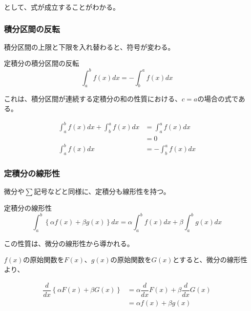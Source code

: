 \documentclass[../../imaging-math]{subfiles}
\begin{document}
として、式が成立することがわかる。

\subsubsection{積分区間の反転}

積分区間の上限と下限を入れ替わると、符号が変わる。

\begin{theorem}{定積分の積分区間の反転}
  \LARGE
  \begin{equation}
    \int_{a}^{b} f(x) dx = -\int_{b}^{a} f(x) dx
  \end{equation}
\end{theorem}

これは、積分区間が連続する定積分の和の性質における、$c=a$の場合の式である。

\begin{align}
  \int_{a}^{b} f(x) dx + \int_{b}^{a} f(x) dx & = \int_{a}^{a} f(x) dx  \\
                                              & = 0                     \\
  \int_{a}^{b} f(x) dx                        & = -\int_{b}^{a} f(x) dx
\end{align}

\subsubsection{定積分の線形性}

微分や$\sum$記号などと同様に、定積分も線形性を持つ。

\begin{theorem}{定積分の線形性}
  \Large
  \begin{equation}
    \int_{a}^{b} \left\{ \alpha f(x) + \beta g(x) \right\} dx = \alpha \int_{a}^{b} f(x) dx + \beta \int_{a}^{b} g(x) dx
  \end{equation}
\end{theorem}

この性質は、微分の線形性から導かれる。

$f(x)$の原始関数を$F(x)$、$g(x)$の原始関数を$G(x)$とすると、微分の線形性より、

\begin{align}
  \dfrac{d}{dx} \left\{ \alpha F(x) + \beta G(x) \right\} & = \alpha \dfrac{d}{dx} F(x) + \beta \dfrac{d}{dx} G(x) \\
                                                          & = \alpha f(x) + \beta g(x)
\end{align}
\end{document}
